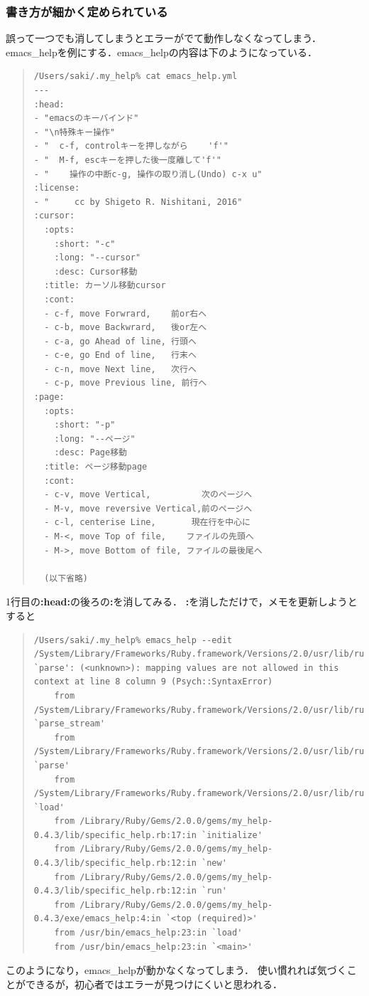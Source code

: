 \subsubsection{書き方が細かく定められている}
誤って一つでも消してしまうとエラーがでて動作しなくなってしまう．
emacs\_helpを例にする．emacs\_helpの内容は下のようになっている．
\begin{quote}\begin{verbatim}
/Users/saki/.my_help% cat emacs_help.yml
---
:head:
- "emacsのキーバインド"
- "\n特殊キー操作"
- "  c-f, controlキーを押しながら    'f'"
- "  M-f, escキーを押した後一度離して'f'"
- "    操作の中断c-g, 操作の取り消し(Undo) c-x u"
:license:
- "     cc by Shigeto R. Nishitani, 2016"
:cursor:
  :opts:
    :short: "-c"
    :long: "--cursor"
    :desc: Cursor移動
  :title: カーソル移動cursor
  :cont:
  - c-f, move Forwrard,    前or右へ
  - c-b, move Backwrard,   後or左へ
  - c-a, go Ahead of line, 行頭へ
  - c-e, go End of line,   行末へ
  - c-n, move Next line,   次行へ
  - c-p, move Previous line, 前行へ
:page:
  :opts:
    :short: "-p"
    :long: "--ページ"
    :desc: Page移動
  :title: ページ移動page
  :cont:
  - c-v, move Vertical,          次のページへ
  - M-v, move reversive Vertical,前のページへ
  - c-l, centerise Line,       現在行を中心に
  - M-<, move Top of file,    ファイルの先頭へ
  - M->, move Bottom of file, ファイルの最後尾へ
  
  (以下省略)
\end{verbatim}\end{quote}
1行目の\textbf{:head:}の後ろの\textbf{:}を消してみる．
\textbf{:}を消しただけで，メモを更新しようとすると
\begin{quote}\begin{verbatim}
/Users/saki/.my_help% emacs_help --edit
/System/Library/Frameworks/Ruby.framework/Versions/2.0/usr/lib/ruby/2.0.0/psych.rb:205:in `parse': (<unknown>): mapping values are not allowed in this context at line 8 column 9 (Psych::SyntaxError)
	from /System/Library/Frameworks/Ruby.framework/Versions/2.0/usr/lib/ruby/2.0.0/psych.rb:205:in `parse_stream'
	from /System/Library/Frameworks/Ruby.framework/Versions/2.0/usr/lib/ruby/2.0.0/psych.rb:153:in `parse'
	from /System/Library/Frameworks/Ruby.framework/Versions/2.0/usr/lib/ruby/2.0.0/psych.rb:129:in `load'
	from /Library/Ruby/Gems/2.0.0/gems/my_help-0.4.3/lib/specific_help.rb:17:in `initialize'
	from /Library/Ruby/Gems/2.0.0/gems/my_help-0.4.3/lib/specific_help.rb:12:in `new'
	from /Library/Ruby/Gems/2.0.0/gems/my_help-0.4.3/lib/specific_help.rb:12:in `run'
	from /Library/Ruby/Gems/2.0.0/gems/my_help-0.4.3/exe/emacs_help:4:in `<top (required)>'
	from /usr/bin/emacs_help:23:in `load'
	from /usr/bin/emacs_help:23:in `<main>'
\end{verbatim}\end{quote}
このようになり，emacs\_helpが動かなくなってしまう．
使い慣れれば気づくことができるが，初心者ではエラーが見つけにくいと思われる．

